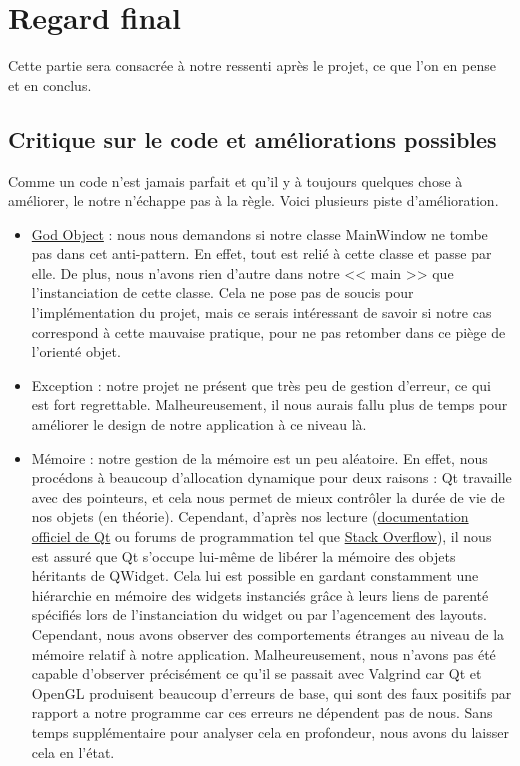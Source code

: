 \documentclass[11pt]{article}
\begin{document}
\section{Regard final}

Cette partie sera consacrée à notre ressenti après le projet, ce que l'on en
pense et en conclus.

\subsection{Critique sur le code et améliorations possibles}

Comme un code n'est jamais parfait et qu'il y à toujours quelques chose à
améliorer, le notre n'échappe pas à la règle. Voici plusieurs piste
d'amélioration.
\begin{itemize}
    \item \href{https://fr.wikipedia.org/wiki/God_object}{God Object} : nous
        nous demandons si notre classe MainWindow ne tombe pas dans cet
        anti-pattern. En effet, tout est relié à cette classe et passe par elle.
        De plus, nous n'avons rien d'autre dans notre << main >> que
        l'instanciation de cette classe. Cela ne pose pas de soucis pour
        l'implémentation du projet, mais ce serais intéressant de savoir si
        notre cas correspond à cette mauvaise pratique, pour ne pas retomber
        dans ce piège de l'orienté objet.
    \item Exception : notre projet ne présent que très peu de gestion d'erreur,
        ce qui est fort regrettable. Malheureusement, il nous aurais fallu plus
        de temps pour améliorer le design de notre application à ce niveau là.
    \item Mémoire : notre gestion de la mémoire est un peu aléatoire. En effet,
        nous procédons à beaucoup d'allocation dynamique pour deux raisons : Qt
        travaille avec des pointeurs, et cela nous permet de mieux contrôler la
        durée de vie de nos objets (en théorie). Cependant, d'après nos lecture
        (\href{https://doc.qt.io/}{documentation officiel de Qt} ou forums de
        programmation tel que \href{https://stackoverflow.com/}{Stack
        Overflow}), il nous est assuré que Qt s'occupe lui-même de libérer la
        mémoire des objets héritants de QWidget. Cela lui est possible en
        gardant constamment une hiérarchie en mémoire des widgets instanciés
        grâce à leurs liens de parenté spécifiés lors de l'instanciation du
        widget ou par l'agencement des layouts. Cependant, nous avons observer
        des comportements étranges au niveau de la mémoire relatif à notre
        application. Malheureusement, nous n'avons pas été capable d'observer
        précisément ce qu'il se passait avec Valgrind car Qt et OpenGL
        produisent beaucoup d'erreurs de base, qui sont des faux positifs par
        rapport a notre programme car ces erreurs ne dépendent pas de nous. Sans
        temps supplémentaire pour analyser cela en profondeur, nous avons du
        laisser cela en l'état.
\end{itemize}
\end{document}

